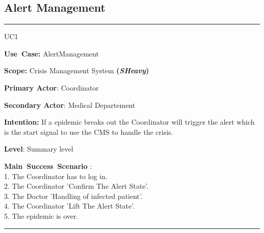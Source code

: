 \subsection{Alert Management}
\vspace{0.5cm}
\hrule
\vspace{0.5cm}
\begin{lyxlist}{UC1}
\small{
\item [\textbf{Use~Case:}] AlertManagement
\item [\textbf{Scope:}] Crisis Management System \textbf{(\emph{SHeavy})}
\item [\textbf{Primary Actor}:] Coordinator
\item [\textbf{Secondary Actor}:] Medical Departement
\item [\textbf{Intention:}] If a epidemic breaks out the Coordinator will
trigger the alert which is the start signal to use the CMS to handle the crisis.
\item [\textbf{Level}:]Summary level
\item [\textbf{Main~Success~Scenario}]:\\
1. The Coordinator has to log in.\\
2. The Coordinator 'Confirm The Alert State'.\\
3. The Doctor 'Handling of infected patient'.\\
4. The Coordinator 'Lift The Alert State'.\\
5. The epidemic is over.\\
}
\end{lyxlist}
\hrule 
\vspace{0.5cm} 

